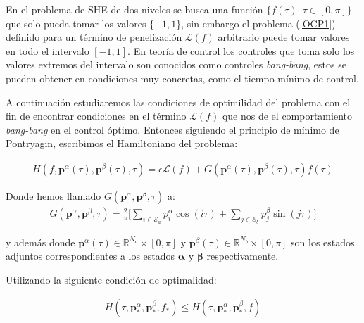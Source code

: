 En el problema de SHE de dos niveles se busca una función $\{f(\tau) \ |  \tau \in [0,\pi] \}$  que solo pueda tomar los valores $\{-1,1\}$, sin embargo el problema (\ref{OCP1}) definido para un término de penelización $\mathcal{L}(f)$ arbitrario puede tomar valores en todo el intervalo $[-1,1]$. 
%
En teoría de control los controles que toma solo los valores extremos del intervalo son conocidos como controles \emph{bang-bang}, estos se pueden obtener en condiciones muy concretas, como el tiempo mínimo de control. 

A continuación estudiaremos las condiciones de optimilidad del problema con el fin de encontrar condiciones en el término $\mathcal{L}(f)$ que nos de el comportamiento \emph{bang-bang} en el control óptimo. Entonces siguiendo el principio de mínimo de Pontryagin, escribimos el Hamiltoniano del problema:

\begin{gather}\label{hamil}
    H(f,\bm{p}^\alpha(\tau),\bm{p}^\beta(\tau),\tau) = \epsilon \mathcal{L}(f) + 
    G(\bm{p}^\alpha(\tau),\bm{p}^\beta(\tau),\tau) f(\tau)
\end{gather}

Donde  hemos llamado $G(\bm{p}^\alpha,\bm{p}^\beta,\tau)$ a:
    \begin{gather}
        G(\bm{p}^\alpha,\bm{p}^\beta,\tau) = \frac{2}{\pi} \Bigg[ 
            \sum_{i \in \mathcal{E}_a} p^\alpha_i \cos(i\tau)+ 
            \sum_{j \in \mathcal{E}_b} p^\beta_j \sin(j\tau) 
        \Bigg]
    \end{gather}

y además donde $\bm{p}^\alpha(\tau) \in \mathbb{R}^{N_a} \times [0,\pi]$ y $\bm{p}^\beta(\tau) \in \mathbb{R}^{N_b}  \times [0,\pi]$ son los estados adjuntos correspondientes a los estados $\bm{\alpha}$ y $\bm{\beta}$ respectivamente. 
\newline 

Utilizando la siguiente condición de optimalidad:

\begin{gather}\label{minH}
    H(\tau,\bm{p}_*^\alpha,\bm{p}^\beta_*,f_*) \leq
    H(\tau,\bm{p}_*^\alpha,\bm{p}^\beta_*,f)
\end{gather}

